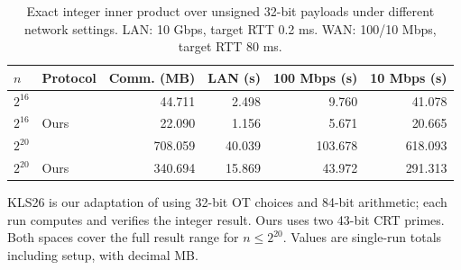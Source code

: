 \begin{table}[t]
\centering
\caption{Exact integer inner product over unsigned 32-bit payloads under different network settings. LAN: 10 Gbps, target RTT 0.2 ms. WAN: 100/10 Mbps, target RTT 80 ms.}
\begin{tabular}{llrrrr}
\hline
$n$ & Protocol & Comm. (MB) & LAN (s) & 100 Mbps (s) & 10 Mbps (s) \\
\hline
$2^{16}$ & \cite{KLS26} & 44.711 & 2.498 & 9.760 & 41.078 \\
$2^{16}$ & Ours & 22.090 & 1.156 & 5.671 & 20.665 \\
\hline
$2^{20}$ & \cite{KLS26} & 708.059 & 40.039 & 103.678 & 618.093 \\
$2^{20}$ & Ours & 340.694 & 15.869 & 43.972 & 291.313 \\
\hline
\end{tabular}
\par\smallskip
{\footnotesize KLS26 is our adaptation of \cite{KLS26} using 32-bit OT choices and 84-bit arithmetic; each run computes and verifies the integer result. Ours uses two 43-bit CRT primes. Both spaces cover the full result range for $n\leq 2^{20}$. Values are single-run totals including setup, with decimal MB.}
\end{table}
